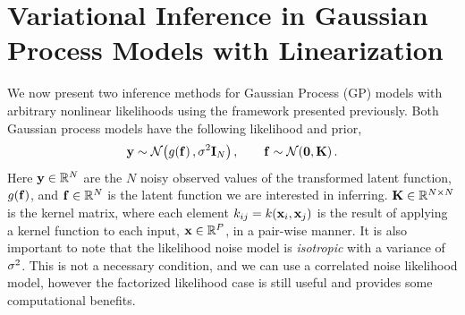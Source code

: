 \documentclass{article} %
\begin{document}
\section{Variational Inference in Gaussian Process Models with Linearization}
\label{sec:gpmod}

We now present two inference methods for Gaussian Process (GP) models
\cite{Rasmussen2006} with arbitrary nonlinear likelihoods using the framework
presented previously.  Both Gaussian process models have the following
likelihood and prior,
\begin{equation}
    \mathbf{y} \sim \mathcal{N}\!\left({g\!\left({{\mathbf{f}}}\right), \sigma^2\mathbf{I}_{N}}\right), \qquad
    \mathbf{f} \sim \mathcal{N}\!\left({\mathbf{0}, \mathbf{K}}\right).
    \label{eq:gplikeprior}
\end{equation}
Here $\mathbf{y} \in \mathbb{R}^{N}$ are the $N$ noisy observed values of the transformed
latent function, $g\!\left({{\mathbf{f}}}\right)$, and $\mathbf{f} \in \mathbb{R}^{N}$ is the latent
function we are interested in inferring. $\mathbf{K} \in \mathbb{R}^{N\times N}$ is the
kernel matrix, where each element $k_{ij} = k\!\left({\mathbf{x}_i,
    \mathbf{x}_j}\right)$ is the result of applying a kernel function to each input,
$\mathbf{x} \in \mathbb{R}^{P}$, in a pair-wise manner. It is also important to note that
the likelihood noise model is \emph{isotropic} with a variance of $\sigma^2$. This
is not a necessary condition, and we can use a correlated noise likelihood
model, however the factorized likelihood case is still useful and provides some
computational benefits. 
    
\end{document}
